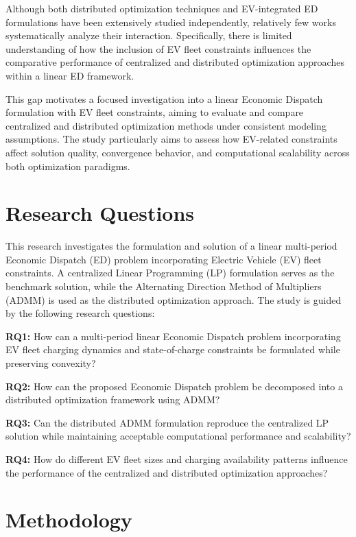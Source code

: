 \documentclass[12pt, a4paper]{article}
\begin{document}
Although both distributed optimization techniques and EV-integrated ED formulations have been extensively studied independently, relatively few works systematically analyze their interaction. Specifically, there is limited understanding of how the inclusion of EV fleet constraints influences the comparative performance of centralized and distributed optimization approaches within a linear ED framework. 

This gap motivates a focused investigation into a linear Economic Dispatch formulation with EV fleet constraints, aiming to evaluate and compare centralized and distributed optimization methods under consistent modeling assumptions. The study particularly aims to assess how EV-related constraints affect solution quality, convergence behavior, and computational scalability across both optimization paradigms.

%
\section{Research Questions}
%

This research investigates the formulation and solution of a linear multi-period Economic Dispatch (ED) problem incorporating Electric Vehicle (EV) fleet constraints. A centralized Linear Programming (LP) formulation serves as the benchmark solution, while the Alternating Direction Method of Multipliers (ADMM) is used as the distributed optimization approach. The study is guided by the following research questions:

\textbf{RQ1:} How can a multi-period linear Economic Dispatch problem incorporating EV fleet charging dynamics and state-of-charge constraints be formulated while preserving convexity?

\textbf{RQ2:} How can the proposed Economic Dispatch problem be decomposed into a distributed optimization framework using ADMM?

\textbf{RQ3:} Can the distributed ADMM formulation reproduce the centralized LP solution while maintaining acceptable computational performance and scalability?

\textbf{RQ4:} How do different EV fleet sizes and charging availability patterns influence the performance of the centralized and distributed optimization approaches?


%
\section{Methodology}
%
\end{document}

